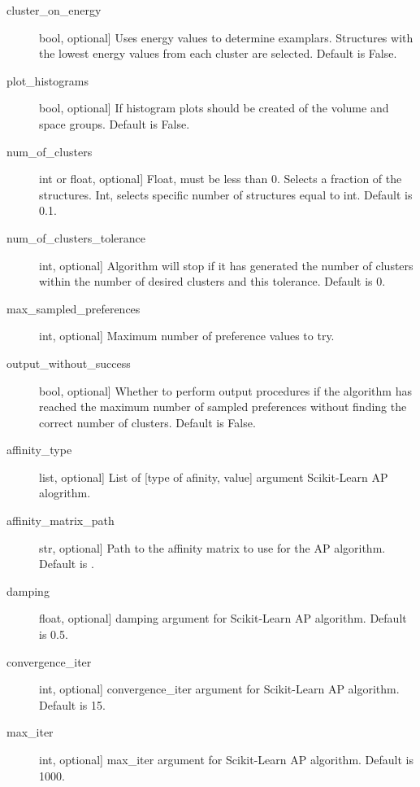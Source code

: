 \documentclass[letterpaper,10pt,english]{sphinxmanual}
\begin{document}
\begin{fulllineitems}
\begin{fulllineitems}
\begin{description}
\item[{cluster\_on\_energy}] \leavevmode{[}bool, optional{]}
Uses energy values to determine examplars. Structures with the
lowest energy values from each cluster are selected.
Default is False.

\item[{plot\_histograms}] \leavevmode{[}bool, optional{]}
If histogram plots should be created of the volume and space
groups. Default is False.

\item[{num\_of\_clusters}] \leavevmode{[}int or float, optional{]}
Float, must be less than 0. Selects a fraction of the structures.
Int, selects specific number of structures equal to int.
Default is 0.1.

\item[{num\_of\_clusters\_tolerance}] \leavevmode{[}int, optional{]}
Algorithm will stop if it has generated the number of clusters
within the number of desired clusters and this tolerance.
Default is 0.

\item[{max\_sampled\_preferences}] \leavevmode{[}int, optional{]}
Maximum number of preference values to try.

\item[{output\_without\_success}] \leavevmode{[}bool, optional{]}
Whether to perform output procedures if the algorithm has reached
the maximum number of sampled preferences without finding the
correct number of clusters. Default is False.

\item[{affinity\_type}] \leavevmode{[}list, optional{]}
List of {[}type of afinity, value{]} argument Scikit-Learn AP alogrithm.

\item[{affinity\_matrix\_path}] \leavevmode{[}str, optional{]}
Path to the affinity matrix to use for the AP algorithm.
Default is .

\item[{damping}] \leavevmode{[}float, optional{]}
damping argument for Scikit-Learn AP algorithm. Default is 0.5.

\item[{convergence\_iter}] \leavevmode{[}int, optional{]}
convergence\_iter argument for Scikit-Learn AP algorithm.
Default is 15.

\item[{max\_iter}] \leavevmode{[}int, optional{]}
max\_iter argument for Scikit-Learn AP algorithm. Default is 1000.


\end{description}
\end{fulllineitems}
\end{fulllineitems}
\end{document}
